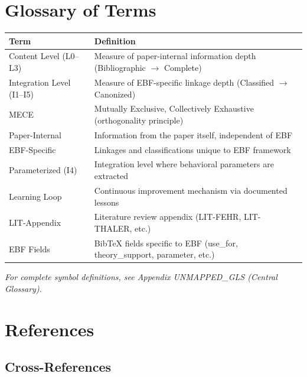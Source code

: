 
\section{Glossary of Terms}

\begin{tabular}{@{}lp{8cm}@{}}
\toprule
\textbf{Term} & \textbf{Definition} \\
\midrule
Content Level (L0--L3) & Measure of paper-internal information depth (Bibliographic $\rightarrow$ Complete) \\
Integration Level (I1--I5) & Measure of EBF-specific linkage depth (Classified $\rightarrow$ Canonized) \\
MECE & Mutually Exclusive, Collectively Exhaustive (orthogonality principle) \\
Paper-Internal & Information from the paper itself, independent of EBF \\
EBF-Specific & Linkages and classifications unique to EBF framework \\
Parameterized (I4) & Integration level where behavioral parameters are extracted \\
Learning Loop & Continuous improvement mechanism via documented lessons \\
LIT-Appendix & Literature review appendix (LIT-FEHR, LIT-THALER, etc.) \\
EBF Fields & BibTeX fields specific to EBF (use\_for, theory\_support, parameter, etc.) \\
\bottomrule
\end{tabular}

\vspace{1em}
\textit{For complete symbol definitions, see Appendix UNMAPPED_GLS (Central Glossary).}


\section{References}
\label{sec:paperint-references}

\subsection{Cross-References}


